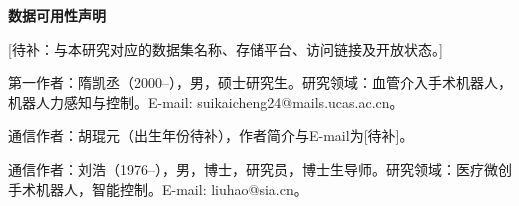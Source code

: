 \documentclass{JQR_LaTeX_Template-0507/JQRnew}
\providecommand{\RevisionColor}{\color{black}}
\newcommand{\revbegin}{\begingroup\RevisionColor}
\newcommand{\revend}{\par\endgroup}
\begin{document}
\noindent
\textbf{数据可用性声明}

\revbegin
[待补：与本研究对应的数据集名称、存储平台、访问链接及开放状态。]
\revend




\begin{AuthorIntroduction}
\Intro 第一作者：隋凯丞（2000--），男，硕士研究生。研究领域：血管介入手术机器人，机器人力感知与控制。E-mail: suikaicheng24@mails.ucas.ac.cn。
\revbegin

\Intro
通信作者：胡琨元（出生年份待补），作者简介与E-mail为[待补]。
\revend

\Intro 通信作者：刘浩（1976--），男，博士，研究员，博士生导师。研究领域：医疗微创手术机器人，智能控制。E-mail: liuhao@sia.cn。

\end{AuthorIntroduction}

\balance
\end{document}
